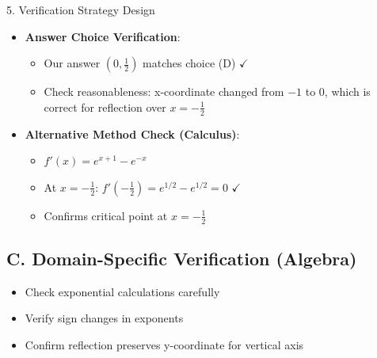 \documentclass[12pt]{article}
\begin{document}
\begin{verificationbox}{5. Verification Strategy Design}
\begin{itemize}[leftmargin=*]
    \item \textbf{Answer Choice Verification}:
    \begin{itemize}
        \item Our answer $(0, \frac{1}{2})$ matches choice (D) $\checkmark$
        \item Check reasonableness: x-coordinate changed from $-1$ to $0$, which is correct for reflection over $x = -\frac{1}{2}$
    \end{itemize}
    
    \item \textbf{Alternative Method Check (Calculus)}:
    \begin{itemize}
        \item $f'(x) = e^{x+1} - e^{-x}$
        \item At $x = -\frac{1}{2}$: $f'(-\frac{1}{2}) = e^{1/2} - e^{1/2} = 0$ $\checkmark$
        \item Confirms critical point at $x = -\frac{1}{2}$
    \end{itemize}
\end{itemize}

\subsection*{C. Domain-Specific Verification (Algebra)}
\begin{itemize}[leftmargin=*]
    \item Check exponential calculations carefully
    \item Verify sign changes in exponents
    \item Confirm reflection preserves y-coordinate for vertical axis
\end{itemize}

\end{verificationbox}
\end{document}
